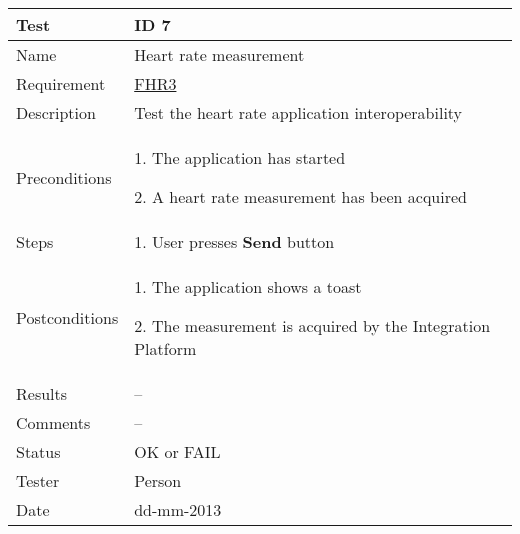 \begin{table}
\begin{center}
\begin{tabular}{ | l | p{10cm} | }
	\hline
	\textbf{Test}	&	\textbf{ID 7} \\
	\hline\noalign{\smallskip}\noalign{\smallskip}\hline
	Name				& Heart rate measurement \\
	Requirement			& \hyperref[table:reqheartrate]{FHR3} \\
	Description			& Test the heart rate application interoperability \\
	Preconditions		&	\par 1. The application has started
							\par 2. A heart rate measurement has been acquired \\
	Steps 				&	\par 1. User presses \textbf{Send} button \\
	Postconditions		&	\par 1. The application shows a toast
							\par 2. The measurement is acquired by the Integration Platform\\
	Results				& -- \\
	Comments			& -- \\
	Status				& OK or FAIL \\
	Tester				& Person \\
	Date				& dd-mm-2013 \\
	\hline
\end{tabular}
\end{center}
\end{table}

